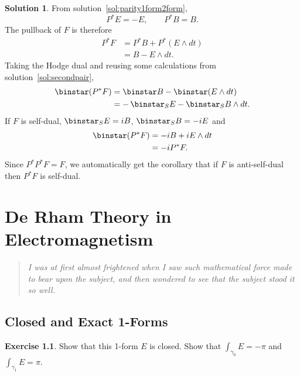 \documentclass[11pt, a4paper]{report}
\theoremstyle{definition}
\newtheorem{exercise}{Exercise}[part]
\newtheorem{solution}{Solution}[part]
\newenvironment{ex}{\begin{exercise}}{\end{exercise}\pagebreak[1]}
\newenvironment{sol}{\begin{solution}}{\end{solution}\pagebreak[3]}
\newenvironment{epigraph}
    {\begin{quote}\small\itshape} %
    {\end{quote}\ignorespacesafterend\vspace{\parskip}}
\newcommand*{\op}[1]{\ensuremath\mathop{}\mathopen{}#1}
\renewcommand*{\star}{\op{\binstar}\mathord{}}
\begin{document}
\begin{sol}

From solution~\ref{sol:parity1form2form},
\[
    P^* E = -E, \qquad
    P^* B = B.
\]
The pullback of $F$ is therefore
\begin{align*}
    P^* F &= P^* B + P^* (E \wedge dt) \\
          &= B - E \wedge dt.
\end{align*}
Taking the Hodge dual and reusing some calculations from solution~\ref{sol:secondpair},
\begin{align*}
    \star(P^* F) &= \star B - \star(E \wedge dt) \\
                 &= -\star_S E - \star_S B \wedge dt.
\end{align*}
If $F$ is self-dual, $\star_S E = iB$, $\star_S B = -i E$ and
\begin{align*}
    \star(P^* F) &= -iB + iE \wedge dt \\
                 &= -i P^* F.
\end{align*}
Since $P^* P^* F = F$, we automatically get the corollary that if $F$ is anti-self-dual then $P^* F$ is self-dual.

\end{sol}

\chapter{De Rham Theory in Electromagnetism}\label{ch:derhamtheory}

\begin{epigraph}
    I was at first almost frightened when I saw such mathematical force made to bear upon the subject, and then wondered to see that the subject stood it so well.
\end{epigraph}

\section{Closed and Exact 1-Forms}

\begin{ex}

Show that this 1-form $E$ is closed. Show that $\int_{\gamma_0} E = -\pi$ and $\int_{\gamma_1} E = \pi$.

\end{ex}
\end{document}
